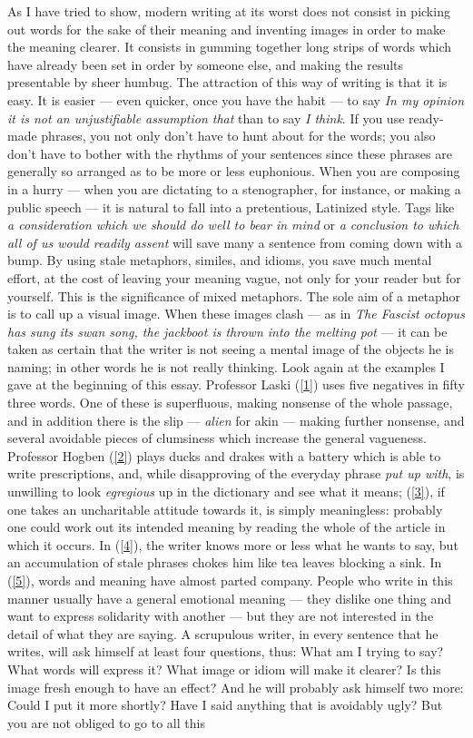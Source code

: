 \documentclass[12pt]{article}
\begin{document}
As I have tried to show, modern writing at its worst does not consist in picking out words for the sake of their meaning and inventing images in order to make the meaning clearer. It consists in gumming together long strips of words which have already been set in order by someone else, and making the results presentable by sheer humbug. The attraction of this way of writing is that it is easy. It is easier — even quicker, once you have the habit — to say \textit{In my opinion it is not an unjustifiable assumption that} than to say \textit{I think}. If you use ready-made phrases, you not only don't have to hunt about for the words; you also don't have to bother with the rhythms of your sentences since these phrases are generally so arranged as to be more or less euphonious. When you are composing in a hurry — when you are dictating to a stenographer, for instance, or making a public speech — it is natural to fall into a pretentious, Latinized style. Tags like \textit{a consideration which we should do well to bear in mind} or \textit{a conclusion to which all of us would readily assent} will save many a sentence from coming down with a bump. By using stale metaphors, similes, and idioms, you save much mental effort, at the cost of leaving your meaning vague, not only for your reader but for yourself. This is the significance of mixed metaphors. The sole aim of a metaphor is to call up a visual image. When these images clash — as in \textit{The Fascist octopus has sung its swan song, the jackboot is thrown into the melting pot} — it can be taken as certain that the writer is not seeing a mental image of the objects he is naming; in other words he is not really thinking. Look again at the examples I gave at the beginning of this essay. Professor Laski (\ref{1}) uses five negatives in fifty three words. One of these is superfluous, making nonsense of the whole passage, and in addition there is the slip — \textit{alien} for akin — making further nonsense, and several avoidable pieces of clumsiness which increase the general vagueness. Professor Hogben (\ref{2}) plays ducks and drakes with a battery which is able to write prescriptions, and, while disapproving of the everyday phrase \textit{put up with}, is unwilling to look \textit{egregious} up in the dictionary and see what it means; (\ref{3}), if one takes an uncharitable attitude towards it, is simply meaningless: probably one could work out its intended meaning by reading the whole of the article in which it occurs. In (\ref{4}), the writer knows more or less what he wants to say, but an accumulation of stale phrases chokes him like tea leaves blocking a sink. In (\ref{5}), words and meaning have almost parted company. People who write in this manner usually have a general emotional meaning — they dislike one thing and want to express solidarity with another — but they are not interested in the detail of what they are saying. A scrupulous writer, in every sentence that he writes, will ask himself at least four questions, thus: What am I trying to say? What words will express it? What image or idiom will make it clearer? Is this image fresh enough to have an effect? And he will probably ask himself two more: Could I put it more shortly? Have I said anything that is avoidably ugly? But you are not obliged to go to all this 
\end{document}
